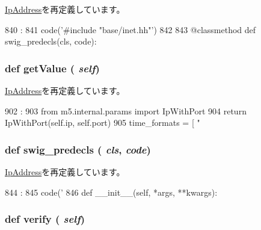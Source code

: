 \hyperlink{classm5_1_1params_1_1IpAddress_a0b408a11a14bd1d770e28f71a6e14ab5}{IpAddress}を再定義しています。


\begin{DoxyCode}
840                                :
841         code('#include "base/inet.hh"')
842 
843     @classmethod
    def swig_predecls(cls, code):
\end{DoxyCode}
\hypertarget{classm5_1_1params_1_1IpWithPort_acc340fbd4335fa34f9d57fb454b28ed0}{
\subsubsection[{getValue}]{\setlength{\rightskip}{0pt plus 5cm}def getValue ( {\em self})}}
\label{classm5_1_1params_1_1IpWithPort_acc340fbd4335fa34f9d57fb454b28ed0}


\hyperlink{classm5_1_1params_1_1IpAddress_acc340fbd4335fa34f9d57fb454b28ed0}{IpAddress}を再定義しています。


\begin{DoxyCode}
902                       :
903         from m5.internal.params import IpWithPort
904         return IpWithPort(self.ip, self.port)
905 
time_formats = [ "%
\end{DoxyCode}
\hypertarget{classm5_1_1params_1_1IpWithPort_ab3dbcf5716623eac67a8ccc074fa7e13}{
\subsubsection[{swig\_\-predecls}]{\setlength{\rightskip}{0pt plus 5cm}def swig\_\-predecls ( {\em cls}, \/   {\em code})}}
\label{classm5_1_1params_1_1IpWithPort_ab3dbcf5716623eac67a8ccc074fa7e13}


\hyperlink{classm5_1_1params_1_1IpAddress_ab3dbcf5716623eac67a8ccc074fa7e13}{IpAddress}を再定義しています。


\begin{DoxyCode}
844                                 :
845         code('%
846 
    def __init__(self, *args, **kwargs):
\end{DoxyCode}
\hypertarget{classm5_1_1params_1_1IpWithPort_aea46c698f871a6aece7a52d69bd684dc}{
\subsubsection[{verify}]{\setlength{\rightskip}{0pt plus 5cm}def verify ( {\em self})}}
\label{classm5_1_1params_1_1IpWithPort_aea46c698f871a6aece7a52d69bd684dc}



